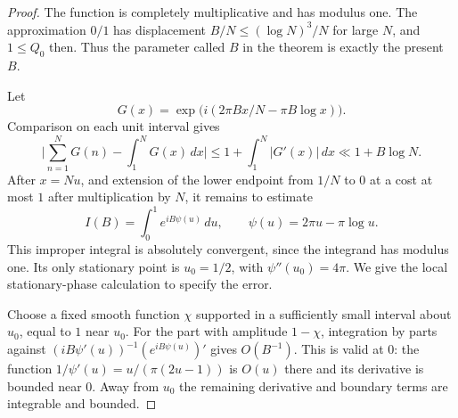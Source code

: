 \documentclass[11pt]{amsart}
\numberwithin{equation}{section}
\numberwithin{figure}{section}
\theoremstyle{definition}
\begin{document}
\begin{proof}
The function is completely multiplicative and has modulus one.
The approximation $0/1$ has displacement $B/N\le(\log N)^3/N$
for large $N$, and $1\le Q_0$ then. Thus the parameter called $B$ in
the theorem is exactly the present $B$.

Let
\[
 G(x)=\exp\bigl(i(2\pi Bx/N-\pi B\log x)\bigr).
\]
Comparison on each unit interval gives
\[
 \bigg|\sum_{n=1}^NG(n)-\int_1^NG(x)\,dx\bigg|
 \le1+\int_1^N|G'(x)|\,dx\ll1+B\log N.
\]
After $x=Nu$, and extension of the lower endpoint from $1/N$ to $0$
at a cost at most $1$ after multiplication by $N$, it remains to
estimate
\[
 I(B)=\int_0^1 e^{iB\psi(u)}\,du,
 \qquad \psi(u)=2\pi u-\pi\log u.
\]
This improper integral is absolutely convergent, since the integrand
has modulus one. Its only stationary point is $u_0=1/2$, with $\psi''(u_0)=4\pi$.
We give the local stationary-phase calculation to specify the error.

Choose a fixed smooth function $\chi$ supported in a sufficiently
small interval about $u_0$, equal to $1$ near $u_0$.
For the part with amplitude $1-\chi$, integration by parts against
$(iB\psi'(u))^{-1}(e^{iB\psi(u)})'$ gives $O(B^{-1})$.
This is valid at $0$: the function
$1/\psi'(u)=u/(\pi(2u-1))$ is $O(u)$ there and its derivative is
bounded near $0$. Away from $u_0$ the remaining derivative and
boundary terms are integrable and bounded.


\end{proof}
\end{document}

